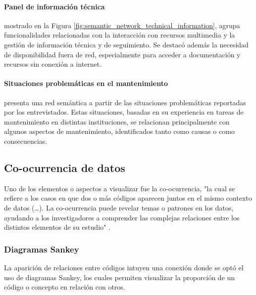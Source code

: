             

            \paragraph{Panel de información técnica} mostrado en la Figura \ref{fig:semantic_network_technical_information}, agrupa funcionalidades relacionadas con la interacción con recursos multimedia y la gestión de información técnica y de seguimiento. Se destacó además la necesidad de disponibilidad fuera de red, especialmente para acceder a documentación y recursos sin conexión a internet.

            

            \paragraph{Situaciones problemáticas en el mantenimiento} presenta una red semántica a partir de las situaciones problemáticas reportadas por los entrevistados. Estas situaciones, basadas en su experiencia en tareas de mantenimiento en distintas instituciones, se relacionan principalmente con algunos aspectos de mantenimiento, identificados tanto como causas o como consecuencias.

            

    \subsection{Co-ocurrencia de datos}

        Uno de los elementos o aspectos a visualizar fue la  co-ocurrencia, "la cual se refiere a los casos en que dos o más códigos aparecen juntos en el mismo contexto de datos (…). La co-ocurrencia puede revelar temas o patrones en los datos, ayudando a los investigadores a comprender las complejas relaciones entre los distintos elementos de su estudio" \parencite{STEWART:SF}.

        \subsubsection{Diagramas Sankey}

            La aparición de relaciones entre códigos intuyen una conexión donde se optó el uso de diagramas Sankey, los cuales permiten visualizar la proporción de un código o concepto en relación con otros.


